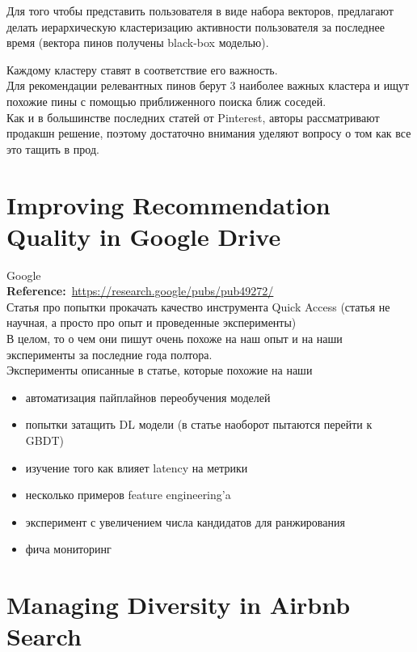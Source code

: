 \begin{bibunit}[plainnat]
Для того чтобы представить пользователя в виде набора векторов, предлагают делать иерархическую кластеризацию активности пользователя за последнее время (вектора пинов получены black-box моделью).

Каждому кластеру ставят в соответствие его важность.  \\

Для рекомендации релевантных пинов берут 3 наиболее важных кластера и ищут похожие пины с помощью приближенного поиска ближ соседей. \\

Как и в большинстве последних статей от Pinterest, авторы рассматривают продакшн решение, поэтому достаточно внимания уделяют вопросу о том как все это тащить в прод.

\section*{Improving Recommendation Quality in Google Drive}

Google \\

\textbf{Reference:}~\url{https://research.google/pubs/pub49272/} \\

Статья про попытки прокачать качество инструмента Quick Access (статья не научная, а просто про опыт и проведенные эксперименты) \\

В целом, то о чем они пишут очень похоже на наш опыт и на наши эксперименты за последние года полтора. \\

Эксперименты описанные в статье, которые похожие на наши
\begin{itemize}
    \item автоматизация пайплайнов переобучения моделей
    \item попытки затащить DL модели (в статье наоборот пытаются перейти к GBDT)
    \item изучение того как влияет latency на метрики
    \item несколько примеров feature engineering'a 
    \item эксперимент с увеличением числа кандидатов для ранжирования
    \item фича мониторинг
\end{itemize}

\section*{Managing Diversity in Airbnb Search}


\end{bibunit}

